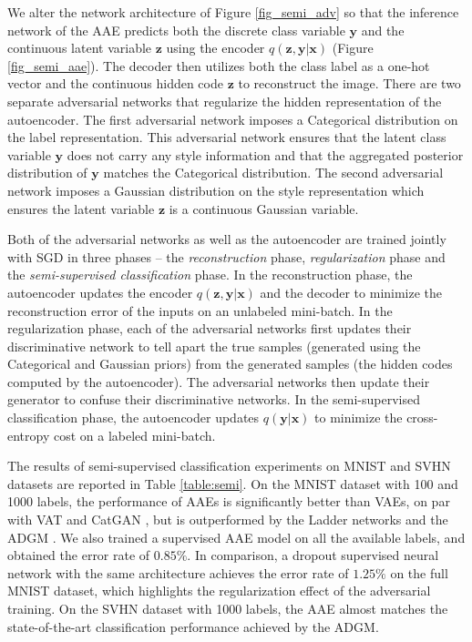 \documentclass{article}
\begin{document}
We alter the network architecture of Figure \ref{fig_semi_adv} so that the inference network of the AAE predicts both the discrete class variable $\mathbf{y}$ and the continuous latent variable $\mathbf{z}$ using the encoder $q(\mathbf{z},\mathbf{y}|\mathbf{x})$ (Figure \ref{fig_semi_aae}). The decoder then utilizes both the class label as a one-hot vector and the continuous hidden code $\mathbf{z}$ to reconstruct the image. There are two separate adversarial networks that regularize the hidden representation of the autoencoder. The first adversarial network imposes a Categorical distribution on the label representation. This adversarial network ensures that the latent class variable $\mathbf{y}$ does not carry any style information and that the aggregated posterior distribution of $\mathbf{y}$ matches the Categorical distribution. The second adversarial network imposes a Gaussian distribution on the style representation which ensures the latent variable $\mathbf{z}$ is a continuous Gaussian variable.

Both of the adversarial networks as well as the autoencoder are trained jointly with SGD in three phases -- the \emph{reconstruction} phase, \emph{regularization} phase and the \emph{semi-supervised classification} phase. In the reconstruction phase, the autoencoder updates the encoder $q(\mathbf{z},\mathbf{y}|\mathbf{x})$ and the decoder to minimize the reconstruction error of the inputs on an unlabeled mini-batch. In the regularization phase, each of the adversarial networks first updates their discriminative network to tell apart the true samples (generated using the Categorical and Gaussian priors) from the generated samples (the hidden codes computed by the autoencoder). The adversarial networks then update their generator to confuse their discriminative networks. In the semi-supervised classification phase, the autoencoder updates $q(\mathbf{y}|\mathbf{x})$ to minimize the cross-entropy cost on a labeled mini-batch. 



The results of semi-supervised classification experiments on MNIST and SVHN datasets are reported in Table \ref{table:semi}. On the MNIST dataset with 100 and 1000 labels, the performance of AAEs is significantly better than VAEs, on par with VAT \citep{vat} and CatGAN \citep{catgan}, but is outperformed by the Ladder networks \citep{ladder} and the ADGM \citep{adgm}. We also trained a supervised AAE model on all the available labels, and obtained the error rate of $0.85\%$. In comparison, a dropout supervised neural network with the same architecture achieves the error rate of $1.25\%$ on the full MNIST dataset, which highlights the regularization effect of the adversarial training. On the SVHN dataset with 1000 labels, the AAE almost matches the state-of-the-art classification performance achieved by the ADGM. 
\end{document}
